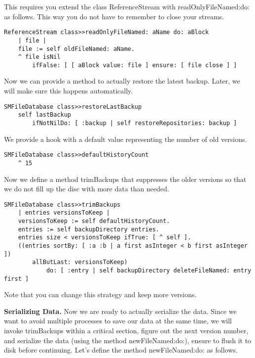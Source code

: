 \documentclass[a4paper,10pt,twoside]{book}
\newcommand{\ct}[1]{{\small\ttfamily\textup{#1}}}
\begin{document}
This requires you extend the class \ct{ReferenceStream} with \ct{readOnlyFileNamed:do:} as follows. This way you do not have to remember to close your streams.

\begin{lstlisting}
ReferenceStream class>>readOnlyFileNamed: aName do: aBlock
    | file |
    file := self oldFileNamed: aName.
    ^ file isNil
        ifFalse: [ [ aBlock value: file ] ensure: [ file close ] ]
\end{lstlisting}

Now we can provide a method to actually restore the latest backup. Later, we will make sure this happens automatically.

\begin{lstlisting}
SMFileDatabase class>>restoreLastBackup
    self lastBackup
        ifNotNilDo: [ :backup | self restoreRepositories: backup ]
\end{lstlisting}

We provide a hook with a default value representing the number of old versions.

\begin{lstlisting}
SMFileDatabase class>>defaultHistoryCount
    ^ 15
\end{lstlisting}

Now we define a method \ct{trimBackups} that suppresses the older versions so that we do not fill up the disc with more data than needed.

\begin{lstlisting}
SMFileDatabase class>>trimBackups
    | entries versionsToKeep |
    versionsToKeep := self defaultHistoryCount.
    entries := self backupDirectory entries.
    entries size < versionsToKeep ifTrue: [ ^ self ].
    ((entries sortBy: [ :a :b | a first asInteger < b first asInteger ])
        allButLast: versionsToKeep)
            do: [ :entry | self backupDirectory deleteFileNamed: entry first ]
\end{lstlisting}

Note that you can change this strategy and keep more versions. 

\textbf{Serializing Data.}
Now we are ready to actually serialize the data. Since we want to avoid multiple processes to save our data at the same time, we will invoke \ct{trimBackups} within a critical section, figure out the next version number, and serialize the data (using the method \ct{newFileNamed:do:}), ensure to flush it to disk before continuing. Let's define the method \ct{newFileNamed:do:} as follows.
\end{document}
